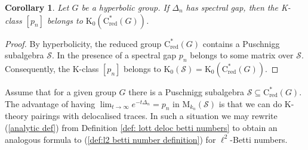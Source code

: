 \documentclass[a4paper,leqno,12pt]{article}
\numberwithin{equation}{section}
\theoremstyle{plain}
\newtheorem{corollary}[theoremcounter]{Corollary}
\theoremstyle{definition}
\theoremstyle{remark}
\newtheorem{remark}[theoremcounter]{Remark}
\newcommand{\Csr}{\mathrm{C}^*_{\text{red}}}
\begin{document}
	
	
	
	
			
	\begin{corollary}
		Let $G$ be a hyperbolic group. If $\Delta_n$ has spectral gap, then 
		the K-class $[p_n]$ belongs to $\mathrm{K}_0(\Csr(G))$.
	\end{corollary}
	
	\begin{proof}
		By hyperbolicity, the reduced group $\Csr(G)$ contains a Puschnigg subalgebra $\mathcal S$. In the presence of a spectral gap $p_n$ belongs to some matrix over $\mathcal S$. Consequently, the K-class $[p_n]$ belongs to $\mathrm K_0(\mathcal S) = \mathrm K_0(\Csr(G))$.		
	\end{proof}
	Assume that for a given group $G$ there is a Puschnigg subalgebra $\mathcal S \subseteq \Csr(G)$. The advantage of having $\lim_{t\to \infty} e^{-t \Delta_n}=p_n$ in $\mathrm M_{k_n}(\mathcal S)$ is that we can do K-theory pairings with delocalised traces.  %
    In such a situation we may rewrite (\ref{analytic def}) from Definition \ref{def: lott deloc betti numbers} to obtain an analogous formula to (\ref{def:l2 betti number definition}) for $\ell^2$-Betti numbers.
	
\end{document}
